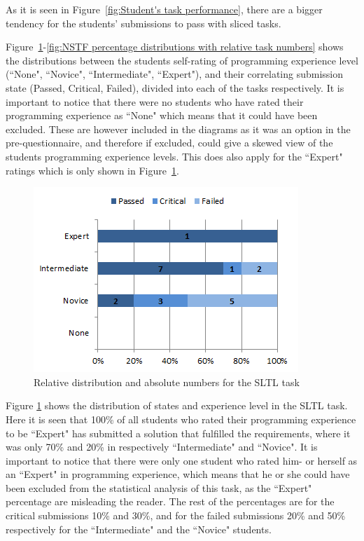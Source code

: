 \documentclass{sig-alternate-05-2015}
\begin{document}
As it is seen in Figure~\ref{fig:Student's task performance}, there are a bigger tendency for the students' submissions to pass with sliced tasks.

Figure~\ref{fig:SLTL percentage distributions with relative task numbers}-\ref{fig:NSTF percentage distributions with relative task numbers} shows the distributions between the students self-rating of programming experience level (``None", ``Novice", ``Intermediate", ``Expert"), and their correlating submission state (Passed, Critical, Failed), divided into each of the tasks respectively.
It is important to notice that there were no students who have rated their programming experience  as ``None" which means that it could have been excluded. These are however included in the diagrams as it was an option in the pre-questionnaire, and therefore if excluded, could give a skewed view of the students programming experience levels. This does also apply for the ``Expert" ratings which is only shown in Figure~\ref{fig:SLTL percentage distributions with relative task numbers}.

\begin{figure}[!ht]
	\centering
	\includegraphics[width=1\linewidth]{img06}
	\caption{Relative distribution and absolute numbers for the SLTL task}
	\label{fig:SLTL percentage distributions with relative task numbers}
\end{figure}

Figure \ref{fig:SLTL percentage distributions with relative task numbers} shows the distribution of states and experience level in the SLTL task.
Here it is seen that 100\% of all students who rated their programming experience to be ``Expert" has submitted a solution that fulfilled the requirements, where it was only 70\% and 20\% in respectively ``Intermediate" and ``Novice".
It is important to notice that there were only one student who rated him- or herself as an ``Expert" in programming experience, which means that he or she could have been excluded from the statistical analysis of this task, as the ``Expert" percentage are misleading the reader. The rest of the percentages are for the critical submissions 10\% and 30\%, and for the failed submissions 20\% and 50\% respectively for the ``Intermediate" and the ``Novice" students.
\end{document}
